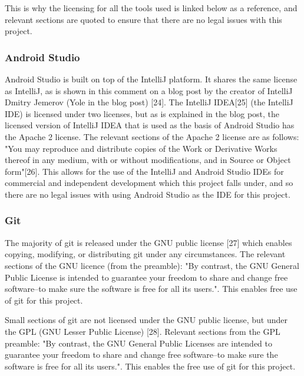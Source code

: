 \documentclass{article}
\begin{document}
This is why the licensing for all the tools used is linked below as a reference, and relevant sections are quoted to ensure that there are no legal issues with this project. \par

\subsubsection{Android Studio}

Android Studio is built on top of the IntelliJ platform. It shares the same license as IntelliJ, as is shown in this comment on a blog post by the creator of IntelliJ Dmitry Jemerov (Yole in the blog post) [24]. The IntelliJ IDEA[25] (the IntelliJ IDE) is licensed under two licenses, but as is explained in the blog post, the licensed version of IntelliJ IDEA that is used as the basis of Android Studio has the Apache 2 license. The relevant sections of the Apache 2 license are as follows: "You may reproduce and distribute copies of the Work or Derivative Works thereof in any medium, with or without modifications, and in Source or Object form"[26]. This allows for the use of the IntelliJ and Android Studio IDEs for commercial and independent development which this project falls under, and so there are no legal issues with using Android Studio as the IDE for this project. \par

\subsubsection{Git}

The majority of git is released under the GNU public license [27] which enables copying, modifying, or distributing git under any circumstances. The relevant sections of the GNU licence (from the preamble): "By contrast, the GNU General Public License is intended to guarantee your freedom to share and change free software--to make sure the software is free for all its users.". This enables free use of git for this project. \par

Small sections of git are not licensed under the GNU public license, but under the GPL (GNU Lesser Public License) [28]. Relevant sections from the GPL preamble: "By contrast, the GNU General Public Licenses are intended to guarantee your freedom to share and change free software--to make sure the software is free for all its users.". This enables the free use of git for this project. \par
\end{document}
